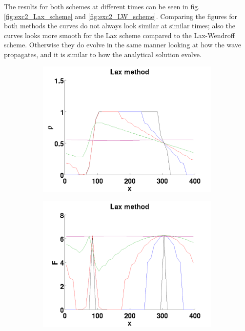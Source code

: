 The results for both schemes at different times can be seen in fig. \ref{fig:exc2_Lax_scheme} and \ref{fig:exc2_LW_scheme}. Comparing the figures for both methods the curves do not always look similar 
at similar times; also the curves looks more smooth for the Lax scheme compared to the Lax-Wendroff scheme. Otherwise they do evolve in the same manner looking at how the wave propagates, and it is similar to how the analytical solution evolve.
\begin{figure}[h!]
\begin{subfigure}{.25\textwidth}
	\centering
	\includegraphics[width=\textwidth]{img/exc2_Lax_p}
	\caption{}
	\label{fig:exc2_Lax_p}
\end{subfigure}
\begin{subfigure}{.25\textwidth}
	\centering
	\includegraphics[width=\textwidth]{img/exc2_Lax_F}

\end{subfigure}
\end{figure}
